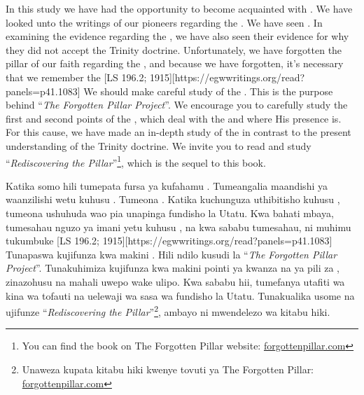 In this study we have had the opportunity to become acquainted with . We have looked unto the writings of our pioneers regarding the . We have seen . In examining the evidence regarding the , we have also seen their evidence for why they did not accept the Trinity doctrine. Unfortunately, we have forgotten the pillar of our faith regarding the , and because we have forgotten, it’s necessary that we remember the [LS 196.2; 1915][https://egwwritings.org/read?panels=p41.1083] We should make careful study of the . This is the purpose behind “\textit{The Forgotten Pillar Project}”. We encourage you to carefully study the first and second points of the , which deal with the  and where His presence is. For this cause, we have made an in-depth study of the  in contrast to the present understanding of the Trinity doctrine. We invite you to read and study “\textit{Rediscovering the Pillar}”\footnote{You can find the book on The Forgotten Pillar website: \href{http://forgottenpillar.com}{forgottenpillar.com}}, which is the sequel to this book.


Katika somo hili tumepata fursa ya kufahamu . Tumeangalia maandishi ya waanzilishi wetu kuhusu . Tumeona . Katika kuchunguza uthibitisho kuhusu , tumeona ushuhuda wao pia unapinga fundisho la Utatu. Kwa bahati mbaya, tumesahau nguzo ya imani yetu kuhusu , na kwa sababu tumesahau, ni muhimu tukumbuke [LS 196.2; 1915][https://egwwritings.org/read?panels=p41.1083] Tunapaswa kujifunza kwa makini . Hili ndilo kusudi la “\textit{The Forgotten Pillar Project}”. Tunakuhimiza kujifunza kwa makini pointi ya kwanza na ya pili za , zinazohusu  na mahali uwepo wake ulipo. Kwa sababu hii, tumefanya utafiti wa kina wa  tofauti na uelewaji wa sasa wa fundisho la Utatu. Tunakualika usome na ujifunze “\textit{Rediscovering the Pillar}”\footnote{Unaweza kupata kitabu hiki kwenye tovuti ya The Forgotten Pillar: \href{http://forgottenpillar.com}{forgottenpillar.com}}, ambayo ni mwendelezo wa kitabu hiki.







